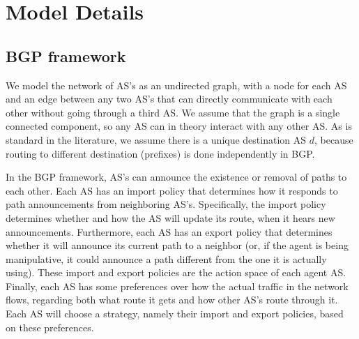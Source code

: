 \documentclass[10pt]{article}
\begin{document}

\section{Model Details}
  \subsection{BGP framework}
    We model the network of AS's as an undirected graph, with a node for each AS
    and an edge between any two AS's that can directly communicate with each other
    without going through a third AS. We assume that the graph is a single
    connected component, so any AS can in theory interact with any other AS.
    As is standard in the literature, we assume there is a unique destination AS
    $d$, because routing to different destination (prefixes) is done
    independently in BGP.

    In the BGP framework, AS's can announce the
    existence or removal of paths to each other.
    Each AS has an import policy that
    determines how it responds to path announcements from neighboring AS's.
    Specifically, the import policy determines whether and how the AS will update
    its route, when it hears new announcements.
    Furthermore, each AS has an export policy that determines whether it will
    announce its current path to a neighbor (or, if the agent is being
    manipulative, it could announce a path different from the one it is actually
    using). These import and export policies are the action space of each agent AS.
    Finally, each AS has some preferences over how the actual traffic in the
    network flows, regarding both what route it gets and how other AS's route through it.
    Each AS will choose a strategy, namely their import and export
    policies, based on these preferences.
\end{document}
